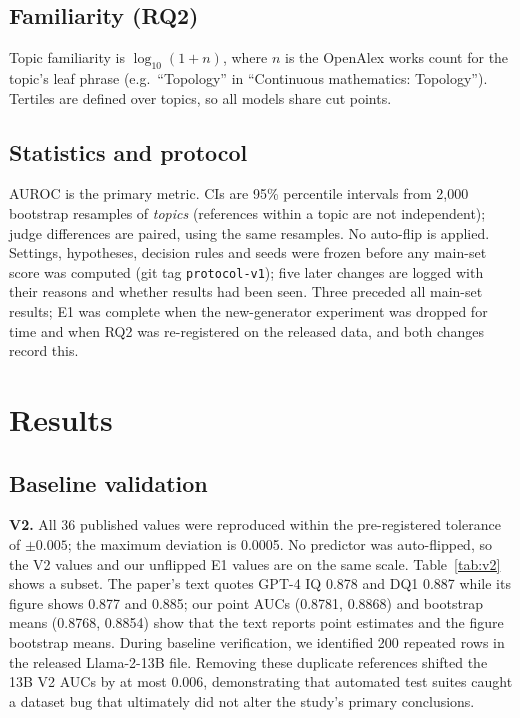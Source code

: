 \documentclass[acmsmall,screen]{acmart}
\begin{document}
\subsection{Familiarity (RQ2)}
Topic familiarity is $\log_{10}(1+n)$, where $n$ is the OpenAlex works count for the topic's leaf phrase (e.g.\ ``Topology'' in ``Continuous mathematics: Topology''). Tertiles are defined over topics, so all models share cut points.

\subsection{Statistics and protocol}
AUROC is the primary metric. CIs are 95\% percentile intervals from 2{,}000 bootstrap resamples of \emph{topics} (references within a topic are not independent); judge differences are paired, using the same resamples. No auto-flip is applied. Settings, hypotheses, decision rules and seeds were frozen before any main-set score was computed (git tag \texttt{protocol-v1}); five later changes are logged with their reasons and whether results had been seen. Three preceded all main-set results; E1 was complete when the new-generator experiment was dropped for time and when RQ2 was re-registered on the released data, and both changes record this.

\section{Results}\label{sec:results}
\subsection{Baseline validation}\label{sec:baselines}
\textbf{V2.} All 36 published values were reproduced within the pre-registered tolerance of $\pm0.005$; the maximum deviation is 0.0005. No predictor was auto-flipped, so the V2 values and our unflipped E1 values are on the same scale. Table~\ref{tab:v2} shows a subset. The paper's text quotes GPT-4 IQ 0.878 and DQ1 0.887 while its figure shows 0.877 and 0.885; our point AUCs (0.8781, 0.8868) and bootstrap means (0.8768, 0.8854) show that the text reports point estimates and the figure bootstrap means. During baseline verification, we identified 200 repeated rows in the released Llama-2-13B file. Removing these duplicate references shifted the 13B V2 AUCs by at most 0.006, demonstrating that automated test suites caught a dataset bug that ultimately did not alter the study's primary conclusions.
\end{document}
